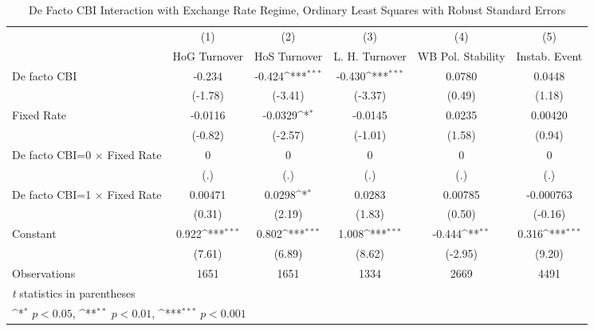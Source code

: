 \begin{table}[htbp]\centering
\def\sym#1{\ifmmode^{#1}\else\(^{#1}\)\fi}
\caption{De Facto CBI Interaction with Exchange Rate Regime, Ordinary Least Squares with Robust Standard Errors \label{imultIndOLSDF}}
\begin{tabular}{l*{5}{c}}
\toprule
                                        &\multicolumn{1}{c}{(1)}&\multicolumn{1}{c}{(2)}&\multicolumn{1}{c}{(3)}&\multicolumn{1}{c}{(4)}&\multicolumn{1}{c}{(5)}\\
                                        &\multicolumn{1}{c}{HoG Turnover}&\multicolumn{1}{c}{HoS Turnover}&\multicolumn{1}{c}{L. H. Turnover}&\multicolumn{1}{c}{WB Pol. Stability}&\multicolumn{1}{c}{Instab. Event}\\
\midrule
De facto CBI                            &   -0.234         &   -0.424\sym{***}&   -0.430\sym{***}&   0.0780         &   0.0448         \\
                                        &  (-1.78)         &  (-3.41)         &  (-3.37)         &   (0.49)         &   (1.18)         \\
\addlinespace
Fixed Rate                              &  -0.0116         &  -0.0329\sym{*}  &  -0.0145         &   0.0235         &  0.00420         \\
                                        &  (-0.82)         &  (-2.57)         &  (-1.01)         &   (1.58)         &   (0.94)         \\
\addlinespace
De facto CBI=0 $\times$ Fixed Rate      &        0         &        0         &        0         &        0         &        0         \\
                                        &      (.)         &      (.)         &      (.)         &      (.)         &      (.)         \\
\addlinespace
De facto CBI=1 $\times$ Fixed Rate      &  0.00471         &   0.0298\sym{*}  &   0.0283         &  0.00785         &-0.000763         \\
                                        &   (0.31)         &   (2.19)         &   (1.83)         &   (0.50)         &  (-0.16)         \\
\addlinespace
Constant                                &    0.922\sym{***}&    0.802\sym{***}&    1.008\sym{***}&   -0.444\sym{**} &    0.316\sym{***}\\
                                        &   (7.61)         &   (6.89)         &   (8.62)         &  (-2.95)         &   (9.20)         \\
\midrule
Observations                            &     1651         &     1651         &     1334         &     2669         &     4491         \\
\bottomrule
\multicolumn{6}{l}{\footnotesize \textit{t} statistics in parentheses}\\
\multicolumn{6}{l}{\footnotesize \sym{*} \(p<0.05\), \sym{**} \(p<0.01\), \sym{***} \(p<0.001\)}\\
\end{tabular}
\end{table}
